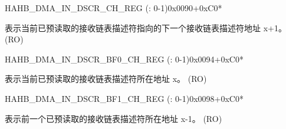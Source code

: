 \begin{register}{H}{AHB\_DMA\_IN\_DSCR\_CH\_REG (: 0-1)}{0x0090+0xC0*}\label{regdesc:AHBDMAINDSCRCHNREG}
%
\regnewline%
\begin{regdesc}\begin{reglist}
\label{fielddesc:AHBDMAINLINKDSCRCHN}\item [AHB\_DMA\_INLINK\_DSCR\_CH\regindex{n}] 表示当前已预读取的接收链表描述符指向的下一个接收链表描述符地址 x+1。 (RO)
\end{reglist}\end{regdesc}
\end{register}


\begin{register}{H}{AHB\_DMA\_IN\_DSCR\_BF0\_CH\_REG (: 0-1)}{0x0094+0xC0*}\label{regdesc:AHBDMAINDSCRBF0CHNREG}
%
\regnewline%
\begin{regdesc}\begin{reglist}
\label{fielddesc:AHBDMAINLINKDSCRBF0CHN}\item [AHB\_DMA\_INLINK\_DSCR\_BF0\_CH\regindex{n}] 表示当前已预读取的接收链表描述符所在地址 x。 (RO)
\end{reglist}\end{regdesc}
\end{register}


\begin{register}{H}{AHB\_DMA\_IN\_DSCR\_BF1\_CH\_REG (: 0-1)}{0x0098+0xC0*}\label{regdesc:AHBDMAINDSCRBF1CHNREG}
%
\regnewline%
\begin{regdesc}\begin{reglist}
\label{fielddesc:AHBDMAINLINKDSCRBF1CHN}\item [AHB\_DMA\_INLINK\_DSCR\_BF1\_CH\regindex{n}] 表示前一个已预读取的接收链表描述符所在地址 x-1。 (RO)
\end{reglist}\end{regdesc}
\end{register}


